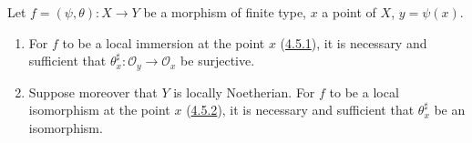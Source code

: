 \begin{proposition}[6.5.4]
\label{I.6.5.4}
Let $f=(\psi,\theta):X\to Y$ be a morphism of finite type, $x$ a point of
$X$, $y=\psi(x)$.
\begin{enumerate}
  \item[(i)] For $f$ to be a local immersion at the point $x$
    (\hyperref[I.4.5.1]{4.5.1}), it is necessary and sufficient that
    $\theta_x^\sharp:\mathscr{O}_y\to\mathscr{O}_x$ be surjective.
  \item[(ii)] Suppose moreover that $Y$ is locally Noetherian. For $f$ to be
    a local isomorphism at the point $x$
    (\hyperref[I.4.5.2]{4.5.2}), it is necessary and sufficient that
    $\theta_x^\sharp$ be an isomorphism.
\end{enumerate}
\end{proposition}

